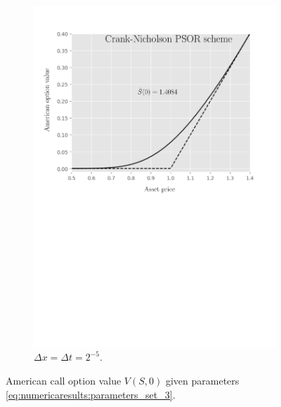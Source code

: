 \begin{figure}[tbp]
\begin{subfigure}{0.4\textwidth}
    \includegraphics[width=\textwidth]{chapters/chapter5/TestCase3CrankNicholsonLCP.pdf}
    \caption{$\Delta{x}=\Delta{t}=2^{-5}$.}
  \end{subfigure}
  \caption{American call option value $V(S, 0)$ given parameters \eqref{eq:numericaresults:parameters_set_3}.}
  \label{fig:lcp:numericaresults:test_case_3}
\end{figure}

